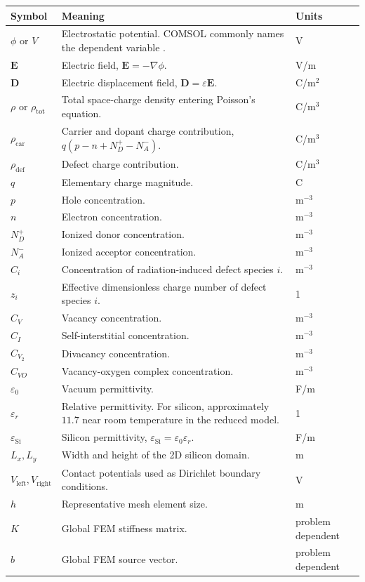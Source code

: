 \documentclass[11pt]{article}
\newcommand{\Evec}{\mathbf{E}}
\newcommand{\Dvec}{\mathbf{D}}
\newcommand{\epss}{\varepsilon_{\mathrm{Si}}}
\newcommand{\rhodef}{\rho_{\mathrm{def}}}
\newcommand{\rhotot}{\rho_{\mathrm{tot}}}
\newcommand{\code}[1]{\texttt{\detokenize{#1}}}
\begin{document}
\renewcommand{\arraystretch}{1.25}
\begin{longtable}{p{}p{}p{}}
\toprule
\textbf{Symbol} & \textbf{Meaning} & \textbf{Units} \\
\midrule
\endhead
$\phi$ or $V$ & Electrostatic potential. COMSOL commonly names the dependent variable \code{V}. & V \\
$\Evec$ & Electric field, $\Evec=-\nabla \phi$. & V/m \\
$\Dvec$ & Electric displacement field, $\Dvec=\varepsilon\Evec$. & C/m$^2$ \\
$\rho$ or $\rhotot$ & Total space-charge density entering Poisson's equation. & C/m$^3$ \\
$\rho_{\mathrm{car}}$ & Carrier and dopant charge contribution, $q(p-n+N_D^+-N_A^-)$. & C/m$^3$ \\
$\rhodef$ & Defect charge contribution. & C/m$^3$ \\
$q$ & Elementary charge magnitude. & C \\
$p$ & Hole concentration. & m$^{-3}$ \\
$n$ & Electron concentration. & m$^{-3}$ \\
$N_D^+$ & Ionized donor concentration. & m$^{-3}$ \\
$N_A^-$ & Ionized acceptor concentration. & m$^{-3}$ \\
$C_i$ & Concentration of radiation-induced defect species $i$. & m$^{-3}$ \\
$z_i$ & Effective dimensionless charge number of defect species $i$. & 1 \\
$C_V$ & Vacancy concentration. & m$^{-3}$ \\
$C_I$ & Self-interstitial concentration. & m$^{-3}$ \\
$C_{V_2}$ & Divacancy concentration. & m$^{-3}$ \\
$C_{VO}$ & Vacancy-oxygen complex concentration. & m$^{-3}$ \\
$\varepsilon_0$ & Vacuum permittivity. & F/m \\
$\varepsilon_r$ & Relative permittivity. For silicon, approximately $11.7$ near room temperature in the reduced model. & 1 \\
$\epss$ & Silicon permittivity, $\epss=\varepsilon_0\varepsilon_r$. & F/m \\
$L_x,L_y$ & Width and height of the 2D silicon domain. & m \\
$V_{\mathrm{left}},V_{\mathrm{right}}$ & Contact potentials used as Dirichlet boundary conditions. & V \\
$h$ & Representative mesh element size. & m \\
$K$ & Global FEM stiffness matrix. & problem dependent \\
$b$ & Global FEM source vector. & problem dependent \\
\bottomrule
\end{longtable}
\end{document}

